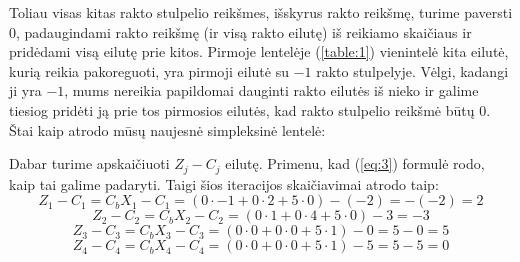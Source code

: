 \documentclass{article}
\begin{document}
Toliau visas kitas rakto stulpelio reikšmes, išskyrus rakto reikšmę, turime paversti 0, padaugindami rakto reikšmę (ir visą rakto eilutę) iš reikiamo skaičiaus ir pridėdami visą eilutę prie kitos. Pirmoje lentelėje (\ref{table:1}) vienintelė kita eilutė, kurią reikia pakoreguoti, yra pirmoji eilutė su $-1$ rakto stulpelyje. Vėlgi, kadangi ji yra $-1$, mums nereikia papildomai dauginti rakto eilutės iš nieko ir galime tiesiog pridėti ją prie tos pirmosios eilutės, kad rakto stulpelio reikšmė būtų 0. Štai kaip atrodo mūsų naujesnė simpleksinė lentelė:
\begin{table}[H]
    \centering
\end{table}
Dabar turime apskaičiuoti $Z_j-C_j$ eilutę. Primenu, kad (\ref{eq:3}) formulė rodo, kaip tai galime padaryti. Taigi šios iteracijos skaičiavimai atrodo taip:
\begin{equation*}
    Z_1-C_1=C_bX_1-C_1=(0\cdot-1+0\cdot2+5\cdot0)-(-2)=-(-2)=2
\end{equation*}
\begin{equation*}
    Z_2-C_2=C_bX_2-C_2=(0\cdot1+0\cdot4+5\cdot0)-3=-3
\end{equation*}
\begin{equation*}
    Z_3-C_3=C_bX_3-C_3=(0\cdot0+0\cdot0+5\cdot1)-0=5-0=5
\end{equation*}
\begin{equation*}
    Z_4-C_4=C_bX_4-C_4=(0\cdot0+0\cdot0+5\cdot1)-5=5-5=0
\end{equation*}
\end{document}
